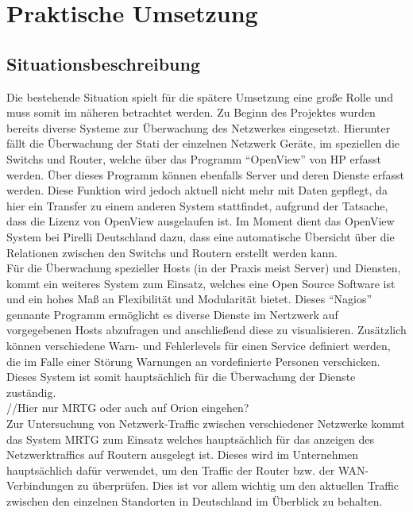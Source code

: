\chapter{Praktische Umsetzung}
\label{cha:praxis}

\section{Situationsbeschreibung}
\label{sec:situation}

Die bestehende Situation spielt für die spätere Umsetzung eine große Rolle und muss somit im näheren betrachtet werden.
Zu Beginn des Projektes wurden bereits diverse Systeme zur Überwachung des Netzwerkes eingesetzt. Hierunter fällt die Überwachung der Stati der einzelnen Netzwerk Geräte, im speziellen die Switchs und Router, welche über das Programm “OpenView” von HP erfasst werden. Über dieses Programm können ebenfalls Server und deren Dienste erfasst werden. Diese Funktion wird jedoch aktuell nicht mehr mit Daten gepflegt, da hier ein Transfer zu einem anderen System stattfindet, aufgrund der Tatsache, dass die Lizenz von OpenView ausgelaufen ist. Im Moment dient das OpenView System bei Pirelli Deutschland dazu, dass eine automatische Übersicht über die Relationen zwischen den Switchs und Routern erstellt werden kann.\\
Für die Überwachung spezieller Hosts (in der Praxis meist Server) und Diensten, kommt ein weiteres System zum Einsatz, welches eine Open Source Software ist und ein hohes Maß an Flexibilität und Modularität bietet. Dieses “Nagios” gennante Programm ermöglicht es diverse Dienste im Nertzwerk auf vorgegebenen Hosts abzufragen und anschließend diese zu visualisieren. Zusätzlich können verschiedene Warn- und Fehlerlevels für einen Service definiert werden, die im Falle einer Störung Warnungen an vordefinierte Personen verschicken.\\
Dieses System ist somit hauptsächlich für die Überwachung der Dienste zuständig.\\
//Hier nur MRTG oder auch auf Orion eingehen?\\
Zur Untersuchung von Netzwerk-Traffic zwischen verschiedener Netzwerke kommt das System MRTG zum Einsatz welches hauptsächlich für das anzeigen des Netzwerktraffics auf Routern ausgelegt ist. Dieses wird im Unternehmen hauptsächlich dafür verwendet, um den Traffic der Router bzw. der WAN-Verbindungen zu überprüfen. Dies ist vor allem wichtig um den aktuellen Traffic zwischen den einzelnen Standorten in Deutschland im Überblick zu behalten.\\
